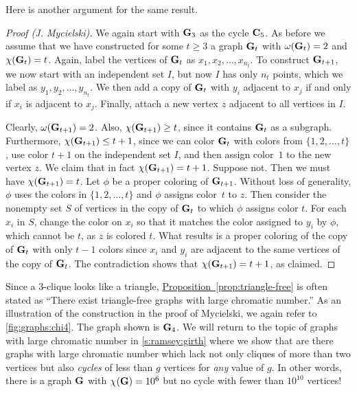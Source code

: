 Here is another argument for the same result.

\begin{proof}[Proof (J. Mycielski)]
  We again start with $\mathbf{G}_3$ as the cycle $\mathbf{C}_5$.  As before we
  assume that we have constructed for some $t\ge3$ a graph $\mathbf{G}_t$
  with $\omega(\mathbf{G}_t)=2$ and $\chi(\mathbf{G}_t) = t$.  Again, label the
  vertices of $\mathbf{G}_t$ as $x_1,x_2,\dots,x_{n_t}$.  To construct
  $\mathbf{G}_{t+1}$, we now start with an independent set $I$, but now $I$
  has only $n_t$ points, which we label as $y_1,y_2,\dots,y_{n_t}$.  We
  then add a copy of $\mathbf{G}_t$ with $y_i$ adjacent to $x_j$ if and only
  if $x_i$ is adjacent to $x_j$.  Finally, attach a new vertex $z$
  adjacent to all vertices in $I$.

  Clearly, $\omega(\mathbf{G}_{t+1})=2$.  Also,
  $\chi(\mathbf{G}_{t+1})\ge t$, since it contains $\mathbf{G}_t$ as a subgraph.
  Furthermore,
  $\chi(\mathbf{G}_{t+1})\leq t+1$, since we can color $\mathbf{G}_t$ with colors
  from $\{1,2,\dots,t\}$, use color $t+1$ on the independent set $I$,
  and then assign color~$1$ to the new vertex $z$. We claim that in fact
  $\chi(\mathbf{G}_{t+1})=t+1$. Suppose not. Then we must have
  $\chi(\mathbf{G}_{t+1})=t$.  Let $\phi$ be a proper
  coloring of $\mathbf{G}_{t+1}$.  Without loss of generality, $\phi$ uses
  the colors in $\{1,2,\dots,t\}$ and $\phi$ assigns color~$t$ to $z$.
  Then consider the nonempty set $S$ of vertices in the copy of
  $\mathbf{G}_t$ to which $\phi$ assigns color $t$.  For each $x_i$ in $S$,
  change the color on $x_i$ so that it matches the color assigned to
  $y_i$ by $\phi$, which cannot be $t$, as $z$ is colored $t$.  What
  results is a proper coloring of the copy of $\mathbf{G}_t$ with only $t-1$
  colors since $x_i$ and $y_i$ are adjacent to the same vertices of
  the copy of $\mathbf{G}_t$.  The contradiction shows that
  $\chi(\mathbf{G}_{t+1})=t+1$, as claimed.
\end{proof}

Since a $3$-clique looks like a triangle,
\hyperref[prop:triangle-free]{Proposition~\ref*{prop:triangle-free}}
is often stated as ``There exist triangle-free graphs with large
chromatic number.'' As an illustration of the construction in the
proof of Mycielski, we again refer to \autoref{fig:graphs:chi4}.  The
graph shown is $\mathbf{G}_4$. We will return to the topic of graphs with
large chromatic number in \autoref{s:ramsey:girth} where we show
that are there graphs with large chromatic number which lack not only
cliques of more than two vertices but also \emph{cycles} of less than
$g$ vertices for \emph{any} value of $g$. In other words, there is a
graph $\mathbf{G}$ with $\chi(\mathbf{G})=10^6$ but no cycle with fewer than
$10^{10}$ vertices!

